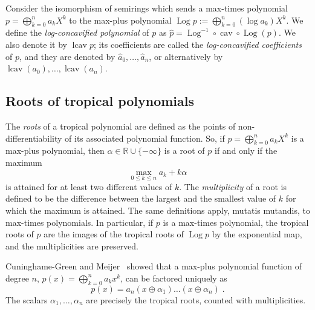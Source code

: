 \documentclass[a4paper]{amsart}
\theoremstyle{definition}
\theoremstyle{plain}
\theoremstyle{remark}
\begin{document}
Consider the isomorphism of semirings which sends a max-times polynomial  $p = \bigoplus_{k=0}^{n} a_k X^k$ to the max-plus
polynomial $\operatorname{Log} p:= \bigoplus_{k=0}^n (\log a_k)X^k$. 
We define the
\emph{log-concavified polynomial} of $p$
 as ${\widehat{p} = \operatorname{Log}^{-1} \circ \operatorname{cav} \circ \operatorname{Log} (p)}$.
 We also denote it by $\operatorname{lcav} p$; its coefficients are called the \emph{log-concavified coefficients} of $p$,
 and they are denoted by $\widehat{a}_0, \dots, \widehat{a}_n$,
 or alternatively by $\operatorname{lcav} (a_0), \dots, \operatorname{lcav} (a_n)$.

\subsection{Roots of tropical polynomials}
The \emph{roots} of a tropical polynomial are defined as the points of non-differentiability of its associated polynomial function. 
So, if $p = \bigoplus_{k=0}^n a_k X^k$ is a max-plus polynomial, then $\alpha \in {\mathbb{R}}\cup\{-\infty\}$ is a root of $p$ if and only if the maximum 
\[
\max_{0 {\leqslant} k {\leqslant} n} a_k + k\alpha
\]
is attained for at least two different values of $k$.
The \emph{multiplicity} of a root is defined
to be the difference between the largest and the smallest value of $k$ 
for which the maximum is attained. The same definitions
apply, mutatis mutandis, to max-times polynomials. In particular,
if $p$ is a max-times polynomial,
the tropical roots of $p$ are the images of the tropical roots of $\operatorname{Log} p$ by
the exponential map, and the multiplicities are preserved. 

Cuninghame-Green and Meijer~\cite{cuninghame80} showed
that a max-plus polynomial function of degree $n$,
$p(x) = \bigoplus_{k=0}^n a_k x^k$, can be factored uniquely
as 
\[
p(x) = a_n (x \oplus \alpha_1)\dots (x\oplus \alpha_n) \;  .
\]
The scalars $\alpha_1,\dots,\alpha_n$ are precisely the tropical
roots, counted with multiplicities.
\end{document}
